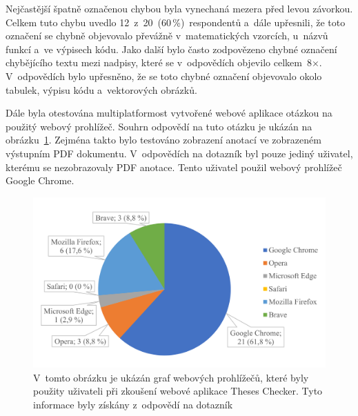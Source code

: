 Nejčastější špatně označenou chybou byla vynechaná mezera před levou závorkou. 
Celkem tuto chybu uvedlo 12~z~20~(60\,\%)~respondentů a~dále upřesnili, že
toto označení se chybně objevovalo převážně v~matematických vzorcích, u~názvů
funkcí a~ve výpisech kódu. Jako další bylo často zodpovězeno chybné označení
chybějícího textu mezi nadpisy, které se v~odpovědích objevilo celkem~8$\times$.
V~odpovědích bylo upřesněno, že se toto chybné označení objevovalo
okolo tabulek, výpisu kódu a~vektorových obrázků.

Dále byla otestována multiplatformost vytvořené webové aplikace otázkou
na použitý webový prohlížeč. Souhrn odpovědí na tuto otázku je ukázán na
obrázku~\ref{pic_graph_browser}. Zejména takto bylo testováno zobrazení
anotací ve zobrazeném výstupním PDF dokumentu. V~odpovědích na dotazník
byl pouze jediný uživatel, kterému se nezobrazovaly PDF anotace. Tento 
uživatel použil webový prohlížeč Google Chrome.

\begin{figure}[H]
    \centering
    \includegraphics[width=0.85\linewidth]{obrazky-figures/graph_browser.pdf}
    \caption{
        V~tomto obrázku je ukázán graf webových prohlížečů, které byly
        použity uživateli při zkoušení webové aplikace Theses Checker.
        Tyto informace byly získány z~odpovědí na dotazník
    }
    \label{pic_graph_browser}
\end{figure}

